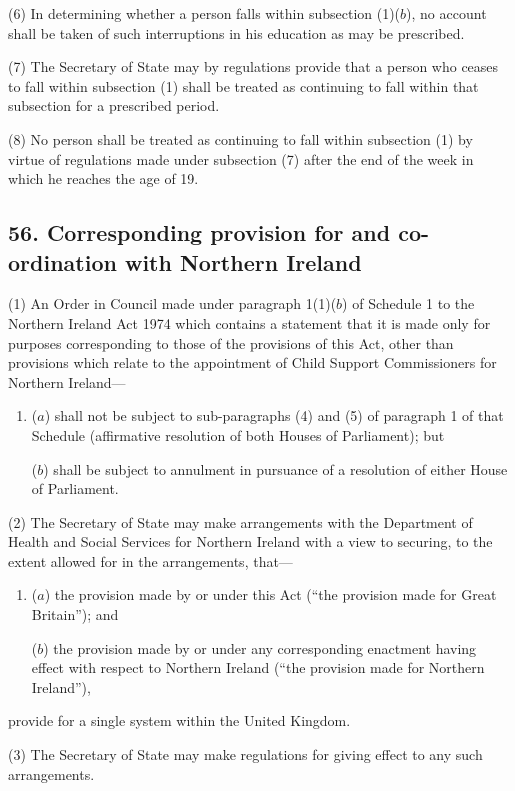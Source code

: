 \documentclass[12pt,a4paper]{article}
\begin{document}
(6) In determining whether a person falls within subsection (1)($b$), no account shall be taken of such interruptions in his education as may be prescribed.

(7) The Secretary of State may by regulations provide that a person who ceases to fall within subsection (1)  shall be treated as continuing to fall within that subsection for a prescribed period.

(8) No person shall be treated as continuing to fall within subsection (1)  by virtue of regulations made under subsection (7)  after the end of the week in which he reaches the age of 19.


\subsection{56. Corresponding provision for and co-ordination with Northern Ireland}

(1) An Order in Council made under paragraph 1(1)($b$)  of Schedule 1 to the Northern Ireland Act 1974 which contains a statement that it is made only for purposes corresponding to those of the provisions of this Act, other than provisions which relate to the appointment of Child Support Commissioners for Northern Ireland—
\begin{enumerate}\item[]
($a$) shall not be subject to sub-paragraphs (4)  and (5)  of paragraph 1 of that Schedule (affirmative resolution of both Houses of Parliament); but

($b$) shall be subject to annulment in pursuance of a resolution of either House of Parliament.
\end{enumerate}

(2) The Secretary of State may make arrangements with the Department of Health and Social Services for Northern Ireland with a view to securing, to the extent allowed for in the arrangements, that—
\begin{enumerate}\item[]
($a$) the provision made by or under this Act (“the provision made for Great Britain”); and

($b$) the provision made by or under any corresponding enactment having effect with respect to Northern Ireland (“the provision made for Northern Ireland”),
\end{enumerate}
provide for a single system within the United Kingdom.

(3) The Secretary of State may make regulations for giving effect to any such arrangements.
\end{document}
